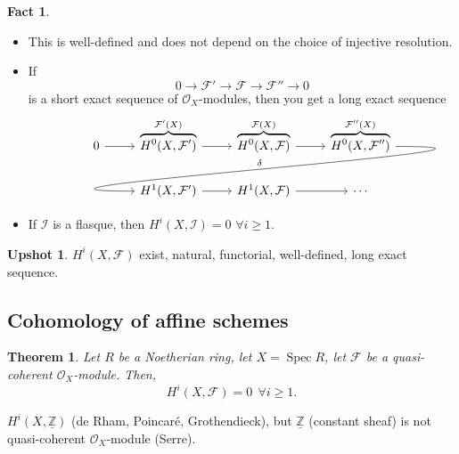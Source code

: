 \documentclass[12pt]{article}
\DeclareMathOperator{\Spec}{Spec}
\newtheorem*{theorem}{Theorem}
\theoremstyle{definition}
\newtheorem*{fact}{Fact}
\newtheorem*{upshot}{Upshot}
\theoremstyle{remark}
\begin{document}
\begin{fact}
\begin{itemize}[label=$-$]
\item This is well-defined and does not depend on the choice of injective resolution.
\item If
\[0\longrightarrow\mathcal{F}'\longrightarrow\mathcal{F}\longrightarrow\mathcal{F}''\longrightarrow0\]
is a short exact sequence of $\mathcal{O}_X$-modules, then you get a long exact sequence
\[
\begin{tikzcd}
0\arrow[r]&\overbrace{H^0(X,\mathcal{F}')}^{\mathcal{F}'(X)}\arrow[r]&\overbrace{H^0(X,\mathcal{F})}^{\mathcal{F}(X)}\arrow[r]&\overbrace{H^0(X,\mathcal{F}'')}^{\mathcal{F}''(X)}\arrow[out=0,in=180,looseness=2,overlay,lld,"\delta",swap]\\
&H^1(X,\mathcal{F}')\arrow[r]&H^1(X,\mathcal{F})\arrow[r]&\cdots
\end{tikzcd}
\]
\item If $\mathcal{I}$ is a flasque, then $H^i(X,\mathcal{I})=0$ $\forall i\geq1$.
\end{itemize}
\end{fact}

\begin{upshot}
$H^i(X,\mathcal{F})$ exist, natural, functorial, well-defined, long exact sequence.
\end{upshot}

\subsection*{Cohomology of affine schemes}
\begin{theorem}
Let $R$ be a Noetherian ring, let $X=\Spec R$, let $\mathcal{F}$ be a quasi-coherent $\mathcal{O}_X$-module. Then,
\[H^i(X,\mathcal{F})=0\ \ \forall i\geq1.\]
\end{theorem}

$H^i(X,\underline{\mathbb{Z}})$ (de Rham, Poincar\'{e}, Grothendieck), but $\underline{\mathbb{Z}}$ (constant sheaf) is not quasi-coherent $\mathcal{O}_X$-module (Serre).
\end{document}
